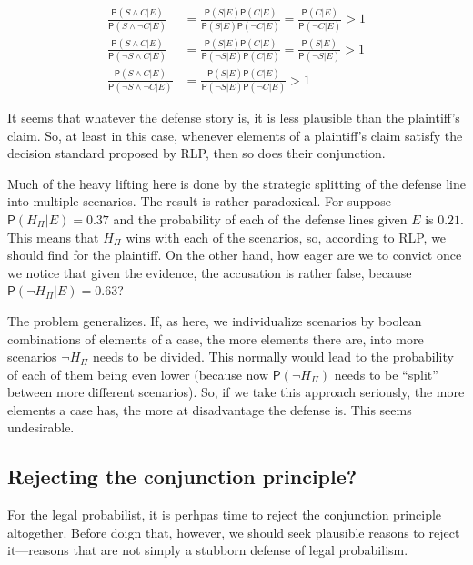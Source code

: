\documentclass[10pt,dvipsnames,enabledeprecatedfontcommands]{scrartcl}
\newcommand{\n}{\neg}
\newcommand{\et}{\wedge}
\newcommand{\pr}[1]{\mathsf{P}(#1)}
\begin{document}
\begin{align}\label{eq:cheng-multiplication}
\frac{\pr{S\et C\vert E}}{\pr{S\et \n C\vert E}} & = \frac{\pr{S\vert E}\pr{C\vert E}}{\pr{S \vert E}\pr{\n C \vert E}}  =\frac{\pr{C\vert E}}{\pr{\n C \vert E}} > 1 \\
\nonumber
\frac{\pr{S\et C\vert E}}{\pr{\n S\et C\vert E}} & = \frac{\pr{S\vert E}\pr{C\vert E}}{\pr{\n S \vert E}\pr{C\vert E}}  = \frac{\pr{S\vert E}}{\pr{\n S \vert E}} > 1 \\
\nonumber
\frac{\pr{S\et C\vert E}}{\pr{\n S\et \n C\vert E}} & = \frac{\pr{S\vert E}\pr{C\vert E}}{\pr{\n S \vert E}\pr{\n C \vert E}}   > 1 
\end{align}

\noindent It seems that whatever the defense story is, it is less
plausible than the plaintiff's claim. So, at least in this case,
whenever elements of a plaintiff's claim satisfy the decision standard
proposed by RLP, then so does their conjunction.

Much of the heavy lifting here is done by the strategic splitting of the
defense line into multiple scenarios. The result is rather paradoxical.
For suppose \(\pr{H_\Pi\vert E}=0.37\) and the probability of each of
the defense lines given \(E\) is \(0.21\). This means that \(H_\Pi\)
wins with each of the scenarios, so, according to RLP, we should find
for the plaintiff. On the other hand, how eager are we to convict once
we notice that given the evidence, the accusation is rather false,
because \(\pr{\n H_\Pi\vert E}=0.63\)?

The problem generalizes. If, as here, we individualize scenarios by
boolean combinations of elements of a case, the more elements there are,
into more scenarios \(\n H_\Pi\) needs to be divided. This normally
would lead to the probability of each of them being even lower (because
now \(\pr{\n H_\Pi}\) needs to be ``split'' between more different
scenarios). So, if we take this approach seriously, the more elements a
case has, the more at disadvantage the defense is. This seems
undesirable.

\subsection{Rejecting the conjunction
principle?}\label{rejecting-the-conjunction-principle}

For the legal probabilist, it is perhpas time to reject the conjunction
principle altogether. Before doign that, however, we should seek
plausible reasons to reject it---reasons that are not simply a stubborn
defense of legal probabilism.
\end{document}
